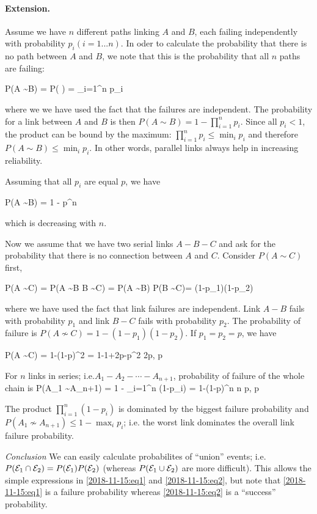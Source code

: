 \paragraph{Extension.} Assume we have $n$ different paths linking $A$ and $B$, each failing independently with probability $p_i (i=1...n)$. In oder to calculate the probability that there is no path between $A$ and $B$, we note that this is the probability that all $n$ paths are failing:

\be\label{2018-11-15:eq1}
P(A \not\sim B) = P( \cap {} \cap \cdots \cap {}) = \prod_{i=1}^n p_i
\ee

where we we have used the fact that the failures are independent. The probability for a link between $A$ and $B$ is then $P(A \sim B) = 1 - \prod_{i=1}^n p_i$. Since all $p_i < 1$, the product can be bound by the maximum: $\prod_{i=1}^n p_i \leq \min_i p_i$ and therefore $P(A \sim B) \leq \min_i p_i$. In other words, parallel links always help in increasing reliability. 

Assuming that all $p_i$ are equal $p$, we have

\bee
P(A \sim B) = 1 - p^n
\eee

which is decreasing with $n$.


Now we assume that we have two serial links $A-B-C$ and ask for the probability that there is no connection between $A$ and $C$. Consider $P(A \sim C)$ first,

\be\label{2018-11-15:eq2}
P(A \sim C) = P(A \sim B \cap B \sim C) = P(A \sim B) P(B \sim C)= (1-p_1)(1-p_2)
\ee

where we have used the fact that link failures are independent. Link $A-B$ fails with probability $p_1$ and link $B-C$ fails with probability $p_2$. The probability of failure is $P(A \not\sim C) = 1 - (1-p_1)(1-p_2)$. If $p_1=p_2=p$, we have

\bee
P(A \not\sim C) = 1-(1-p)^2 = 1-1+2p-p^2 \approx 2p, \quad p 
\eee

For $n$ links in series; i.e.$A_1 - A_2 - \cdots - A_{n+1}$, probability of failure of the whole chain is
\bee
P(A_1 \not\sim A_{n+1}) = 1 - \prod_{i=1}^n (1-p_i) = 1-(1-p)^n \approx n p, \quad p 
\eee

The product $\prod_{i=1}^n (1-p_i)$ is dominated by the biggest failure probability and $P(A_1 \not\sim A_{n+1}) \leq 1 - \max_i p_i$; i.e. the worst link dominates the overall link failure probability.

\emph{Conclusion} We can easily calculate probabilites of ``union'' events; i.e. $P(\mathcal{E}_1 \cap \mathcal{E}_2) = P(\mathcal{E}_1) P(\mathcal{E}_2)$ (whereas $P(\mathcal{E}_1 \cup \mathcal{E}_2)$ are more difficult). This allows the simple expressions in \eqref{2018-11-15:eq1} and \eqref{2018-11-15:eq2}, but note that \eqref{2018-11-15:eq1} is a failure probability whereas \eqref{2018-11-15:eq2} is a ``success'' probability.

